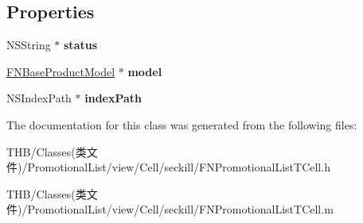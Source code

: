 \subsection*{Properties}
\begin{DoxyCompactItemize}
\item 
\mbox{\label{interface_f_n_promotional_list_t_cell_a31a0d7baab9e21596669ed493e535aba}} 
N\+S\+String $\ast$ {\bfseries status}
\item 
\mbox{\label{interface_f_n_promotional_list_t_cell_a0a5e556931506f816c41357ff3ab2651}} 
\mbox{\hyperlink{interface_f_n_base_product_model}{F\+N\+Base\+Product\+Model}} $\ast$ {\bfseries model}
\item 
\mbox{\label{interface_f_n_promotional_list_t_cell_a92c15c75c6cce095cc1a1b8d5fd96851}} 
N\+S\+Index\+Path $\ast$ {\bfseries index\+Path}
\end{DoxyCompactItemize}


The documentation for this class was generated from the following files\+:\begin{DoxyCompactItemize}
\item 
T\+H\+B/\+Classes(类文件)/\+Promotional\+List/view/\+Cell/seckill/F\+N\+Promotional\+List\+T\+Cell.\+h\item 
T\+H\+B/\+Classes(类文件)/\+Promotional\+List/view/\+Cell/seckill/F\+N\+Promotional\+List\+T\+Cell.\+m\end{DoxyCompactItemize}
